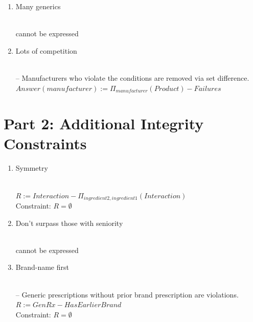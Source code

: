 \documentclass{article}
\newcommand{\var}[1]{\mathit{#1}}
\begin{document}
\begin{enumerate}
\item {\large Many generics}

{~}\\
{\large
cannot be expressed
}

\item {\large Lots of competition}

{~}\\
{\large
-- Manufacturers who violate the conditions are removed via set difference. \\[5pt]
$
Answer(\var{manufacturer}) :=
  \Pi_{\var{manufacturer}}(\var{Product})
  -
  Failures
$
}

\end{enumerate}

\section*{Part 2: Additional Integrity Constraints}

\begin{enumerate}

\item {\large Symmetry}

{~}\\
{\large
$
R :=
  \var{Interaction}
  -
  \Pi_{\var{ingredient2}, \var{ingredient1}}(\var{Interaction})
$ \\[5pt]

Constraint: $R = \emptyset$
}

\item {\large Don't surpass those with seniority}

{~}\\
{\large
cannot be expressed
}

\item {\large Brand-name first}

{~}\\
{\large
-- Generic prescriptions without prior brand prescription are violations. \\[5pt]
$
R :=
  GenRx - HasEarlierBrand
$ \\[5pt]

Constraint: $R = \emptyset$
}

\end{enumerate}
\end{document}
